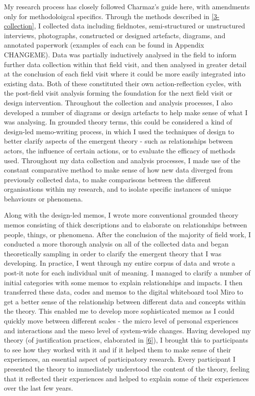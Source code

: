 My research process has closely followed Charmaz's guide here, with amendments only for methodoloigcal specifics. Through the methods described in \ref{3-collection}, I collected data including fieldnotes, semi-structured or unstructured interviews, photographs, constructed or designed artefacts, diagrams, and annotated paperwork (examples of each can be found in Appendix CHANGEME). Data was partially inductively analysed in the field to inform further data collection within that field visit, and then analysed in greater detail at the conclusion of each field visit where it could be more easily integrated into existing data. Both of these constituted their own action-reflection cycles, with the post-field visit analysis forming the foundation for the next field visit or design intervention. Throughout the collection and analysis processes, I also developed a number of diagrams or design artefacts to help make sense of what I was analysing. In grounded theory terms, this could be considered a kind of design-led memo-writing process, in which I used the techniques of design to better clarify aspects of the emergent theory - such as relationships between actors, the influence of certain actions, or to evaluate the efficacy of methods used. Throughout my data collection and analysis processes, I made use of the constant comparative method to make sense of how new data diverged from previously collected data, to make comparisons between the different organisations within my research, and to isolate specific instances of unique behaviours or phenomena.

Along with the design-led memos, I wrote more conventional grounded theory memos consisting of thick descriptions and to elaborate on relationships between people, things, or phenomena. After the conclusion of the majority of field work, I conducted a more thorough analysis on all of the collected data and began theoretically sampling in order to clarify the emergent theory that I was developing. In practice, I went through my entire corpus of data and wrote a post-it note for each individual unit of meaning. I managed to clarify a number of initial categories with some memos to explain relationships and impacts. I then transferred these data, codes and memos to the digital whiteboard tool Miro to get a better sense of the relationship between different data and concepts within the theory. This enabled me to develop more sophisticated memos as I could quickly move between different scales - the micro level of personal experiences and interactions and the meso level of system-wide changes. Having developed my theory (of justification practices, elaborated in \ref{6}), I brought this to participants to see how they worked with it and if it helped them to make sense of their experiences, an essential aspect of participatory research. Every participant I presented the theory to immediately understood the content of the theory, feeling that it reflected their experiences and helped to explain some of their experiences over the last few years.

